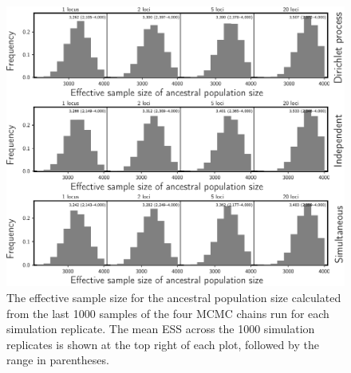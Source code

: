 \begin{figure}[htbp]
    \begin{center}
        \includegraphics[width=\textwidth,height=0.9\textheight,keepaspectratio]{../images/from-project-repo/plots/tex-plot-grids/grid-ess-root-pop-size-histograms-cropped.pdf}
        \caption{
            The effective sample size \citep[ESS;][]{Gong2014} for the
            ancestral population size calculated from the last 1000 samples of
            the four MCMC chains run for each simulation replicate.
            The mean ESS across the 1000 simulation replicates is shown at the
            top right of each plot, followed by the range in parentheses.
        }
        \label{fig:essrootpopsize}
    \end{center}
\end{figure}

